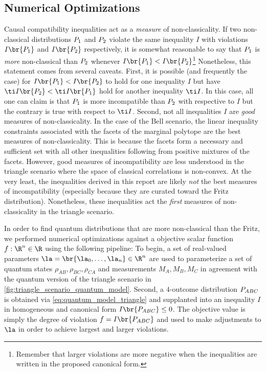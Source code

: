 \documentclass[aps, 10pt, english, twoside, pra, nofootinbib, tightenlines, longbibliography]{revtex4-1}
\begin{document}
    \subsection{Numerical Optimizations}
    \label{sec:optimizations}
    Causal compatibility inequalities act as a \textit{measure} of non-classicality. If two non-classical distributions $\prob[1]$ and $\prob[2]$ violate the same inequality $I$ with violations $I\br{\prob[1]}$ and $I\br{\prob[2]}$ respectively, it is somewhat reasonable to say that $\prob[1]$ is \textit{more} non-classical than $\prob[2]$ whenever ${I\br{\prob[1]}} < I\br{\prob[2]}$\footnote{Remember that larger violations are more negative when the inequalities are written in the proposed canonical form.} Nonetheless, this statement comes from several caveats. First, it is possible (and frequently the case) for ${I\br{\prob[1]}} < I\br{\prob[2]}$ to hold for one inequality $I$ but have ${\ti I\br{\prob[2]}} < \ti I\br{\prob[1]}$ hold for another inequality $\ti I$. In this case, all one can claim is that $\prob[1]$ is more incompatible than $\prob[2]$ with respective to $I$ but the contrary is true with respect to $\ti I$. Second, not all inequalities $I$ are \textit{good} measures of non-classicality. In the case of the Bell scenario, the linear inequality constraints associated with the facets of the marginal polytope are the best measures of non-classicality. This is because the facets form a necessary and sufficient set with all other inequalities following from positive mixtures of the facets. However, good measures of incompatibility are less understood in the triangle scenario where the space of classical correlations is non-convex. At the very least, the inequalities derived in this report are likely \textit{not} the best measures of incompatibility (especially because they are curated toward the Fritz distribution). Nonetheless, these inequalities act the \textit{first} measures of non-classicality in the triangle scenario.

    In order to find quantum distributions that are more non-classical than the Fritz, we performed numerical optimizations against a objective scalar function $f: \R^n \in \R$ using the following pipeline: To begin, a set of real-valued parameters $\la = \br{\la_0, \ldots, \la_n} \in \R^{n}$ are used to parameterize a set of quantum states $\rho_{AB}, \rho_{BC}, \rho_{CA}$ and measurements $M_A, M_B, M_C$ in agreement with the quantum version of the triangle scenario in \cref{fig:triangle_scenario_quantum_model}. Second, a $4$-outcome distribution $\prob[ABC]$ is obtained via \cref{eq:quantum_model_triangle} and supplanted into an inequality $I$ in homogeneous and canonical form $I\br{\prob[ABC]} \leq 0$. The objective value is simply the degree of violation $f = I\br{\prob[ABC]}$ and used to make adjustments to $\la$ in order to achieve largest and larger violations.
\end{document}
